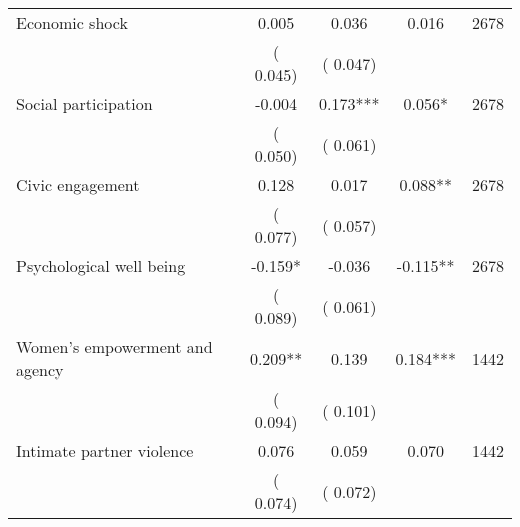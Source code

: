 \begin{tabular}{l*{4}{c}}
 Economic shock &              0.005 &         0.036 &           0.016 & 2678                       \\  
                 &        (       0.045)                   &        (       0.047)                        &                                                             &                                                      \\      

 Social participation &             -0.004 &         0.173*** &           0.056* & 2678                       \\  
                 &        (       0.050)                   &        (       0.061)                        &                                                             &                                                      \\      

 Civic engagement &              0.128 &         0.017 &           0.088** & 2678                       \\  
                 &        (       0.077)                   &        (       0.057)                        &                                                             &                                                      \\      

 Psychological well being &             -0.159* &        -0.036 &          -0.115** & 2678                       \\  
                 &        (       0.089)                   &        (       0.061)                        &                                                             &                                                      \\      

 Women's empowerment and agency &              0.209** &         0.139 &           0.184*** & 1442                       \\  
                 &        (       0.094)                   &        (       0.101)                        &                                                             &                                                      \\      

 Intimate partner violence &              0.076 &         0.059 &           0.070 & 1442                       \\  
                 &        (       0.074)                   &        (       0.072)                        &                                                             &                                                      \\      

\hline \end{tabular}                                                                                                              
